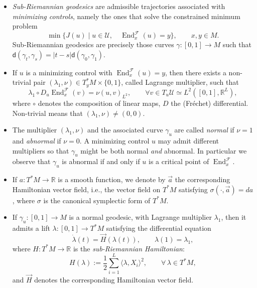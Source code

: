 \documentclass[11pt,a4paper]{article}
\theoremstyle{plain}
\theoremstyle{definition}
\theoremstyle{remark}
\numberwithin{equation}{section}
\newcommand{\R}{\mathbb{R}} %
\DeclareMathOperator{\End}{\mathrm{End}}
\newcommand{\sfd}{\mathsf d}
\begin{document}
\begin{itemize}
\item \emph{Sub-Riemannian geodesics} are admissible trajectories associated with \emph{minimizing controls}, namely the ones that solve the constrained minimum problem
\begin{equation} \label{eq:Ju}
\min\{J(u) \mid  u \in \mathcal{U},\quad \End^{\mathscr{F}}_x(u) = y\},\qquad x,y\in M.
\end{equation}
Sub-Riemannian geodesics are precisely those curves $\gamma:[0,1]\to M$ such that $\sfd(\gamma_t,\gamma_s)=|t-s|\sfd(\gamma_0,\gamma_1)$.

\item If $u$ is a minimizing control with $\End^{\mathscr{F}}_x(u)=y$, then there exists a non-trivial pair $(\lambda_1,\nu) \in T_{y}^*M \times \{0,1\}$, called Lagrange multiplier, such that
\begin{equation}\label{eq:multipliers}
\lambda_1 \circ D_u \End^{\mathscr{F}}_x(v)  = \nu  (u,v)_{L^2}, \qquad \forall v\in T_u\mathcal{U} \simeq L^2([0,1],\R^L),
\end{equation}
where $\circ$ denotes the composition of linear maps, $D$ the (Fr\'echet) differential. Non-trivial means that $(\lambda_1,\nu)\neq (0,0)$.

\item The multiplier $(\lambda_1,\nu)$ and the associated curve $\gamma_u$ are called \emph{normal} if $\nu = 1$ and \emph{abnormal} if $\nu = 0$. A minimizing control $u$ may admit different multipliers so that $\gamma_{u}$ might be both normal \emph{and} abnormal. In particular we observe that $\gamma_u$ is abnormal if and only if $u$ is a critical point of $\End^{\mathscr{F}}_x$.

\item If $a:T^{*}M\to \R$ is a smooth function,  we denote by $\vec{a}$ the corresponding Hamiltonian vector field, i.e., the vector field on $T^{*}M$ satisfying $\sigma(\cdot, \vec a)=da$, where $\sigma$ is the canonical symplectic form of $T^*M$.
\item If $\gamma_u:[0,1]\to M$ is a normal geodesic, with Lagrange multiplier $\lambda_1$, then it admits a lift $\lambda :[0,1]\to T^*M$ satisfying the differential equation 
\begin{equation}
\dot{\lambda}(t) = \vec{H}(\lambda(t)),\qquad \lambda(1)=\lambda_{1},
\end{equation}
where $H : T^*M \to \R$ is the \emph{sub-Riemannian Hamiltonian}:
\begin{equation}
H(\lambda) := \frac{1}{2}\sum_{i=1}^{L} \langle \lambda,X_i\rangle^{2}, \qquad \forall\,\lambda \in T^*M,
\end{equation}
and $\vec H$ denotes the corresponding Hamiltonian vector field.


\end{itemize}
\end{document}
